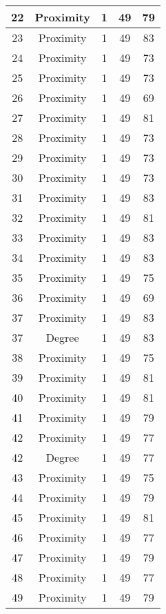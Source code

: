 \documentclass[results.tex]{subfiles}
\begin{document}
\begin{center}
\begin{tabular}{| c || c | c | c | c |}
    \hline
    22 & Proximity & 1 & 49 & 79 \\ 
    \hline
    23 & Proximity & 1 & 49 & 83 \\ 
    \hline
    24 & Proximity & 1 & 49 & 73 \\ 
    \hline
    25 & Proximity & 1 & 49 & 73 \\ 
    \hline
    26 & Proximity & 1 & 49 & 69 \\ 
    \hline
    27 & Proximity & 1 & 49 & 81 \\ 
    \hline
    28 & Proximity & 1 & 49 & 73 \\ 
    \hline
    29 & Proximity & 1 & 49 & 73 \\ 
    \hline
    30 & Proximity & 1 & 49 & 73 \\ 
    \hline
    31 & Proximity & 1 & 49 & 83 \\ 
    \hline
    32 & Proximity & 1 & 49 & 81 \\ 
    \hline
    33 & Proximity & 1 & 49 & 83 \\ 
    \hline
    34 & Proximity & 1 & 49 & 83 \\ 
    \hline
    35 & Proximity & 1 & 49 & 75 \\ 
    \hline
    36 & Proximity & 1 & 49 & 69 \\ 
    \hline
    37 & Proximity & 1 & 49 & 83 \\ 
    \hline
    37 & Degree & 1 & 49 & 83 \\ 
    \hline
    38 & Proximity & 1 & 49 & 75 \\ 
    \hline
    39 & Proximity & 1 & 49 & 81 \\ 
    \hline
    40 & Proximity & 1 & 49 & 81 \\ 
    \hline
    41 & Proximity & 1 & 49 & 79 \\ 
    \hline
    42 & Proximity & 1 & 49 & 77 \\ 
    \hline
    42 & Degree & 1 & 49 & 77 \\ 
    \hline
    43 & Proximity & 1 & 49 & 75 \\ 
    \hline
    44 & Proximity & 1 & 49 & 79 \\ 
    \hline
    45 & Proximity & 1 & 49 & 81 \\ 
    \hline
    46 & Proximity & 1 & 49 & 77 \\ 
    \hline
    47 & Proximity & 1 & 49 & 79 \\ 
    \hline
    48 & Proximity & 1 & 49 & 77 \\ 
    \hline
    49 & Proximity & 1 & 49 & 79 \\ 
    \hline   \end{tabular}
\end{center}
\end{document}
